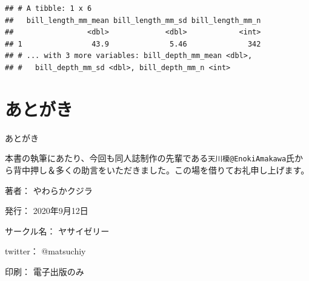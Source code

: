 \documentclass[
  xelatex,ja=standard, b5paper]{bxjsbook}
\begin{document}
\begin{verbatim}
## # A tibble: 1 x 6
##   bill_length_mm_mean bill_length_mm_sd bill_length_mm_n
##                 <dbl>             <dbl>            <int>
## 1                43.9              5.46              342
## # ... with 3 more variables: bill_depth_mm_mean <dbl>,
## #   bill_depth_mm_sd <dbl>, bill_depth_mm_n <int>
\end{verbatim}

\hypertarget{atogaki}{%
\chapter*{あとがき}\label{atogaki}}

あとがき

本書の執筆にあたり、今回も同人誌制作の先輩である\texttt{天川榎@EnokiAmakawa}氏から背中押し＆多くの助言をいただきました。この場を借りてお礼申し上げます。

\clearpage
{}
\begin{flushright}
\begin{minipage}{0.5\hsize}
\begin{description}
  \item{著者：} やわらかクジラ
  \item{発行：} 2020年9月12日
  \item{サークル名：} ヤサイゼリー
  \item{twitter：} @matsuchiy
  \item{印刷：} 電子出版のみ
\end{description}
\end{minipage}
\end{flushright}
\clearpage
\end{document}
